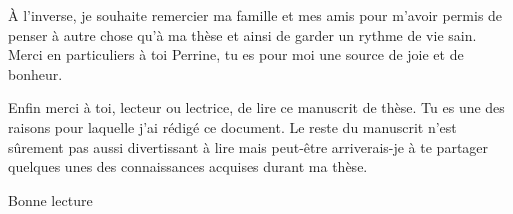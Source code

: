 \begin{acknowledgements}
\medskip

\`A l'inverse, je souhaite remercier ma famille et mes amis pour m'avoir permis de penser à autre chose qu'à ma thèse et ainsi de garder un rythme de vie sain.
Merci en particuliers à toi Perrine, tu es pour moi une source de joie et de bonheur.

\medskip

Enfin merci à toi, lecteur ou lectrice, de lire ce manuscrit de thèse.
Tu es une des raisons pour laquelle j'ai rédigé ce document.
Le reste du manuscrit n'est sûrement pas aussi divertissant à lire mais peut-être arriverais-je à te partager quelques unes des connaissances acquises durant ma thèse.

\vfill

\hfill Bonne lecture
\end{acknowledgements}


\tableofcontents


\mainmatter %

\pagestyle{thesis} %

\adjustmtc

















